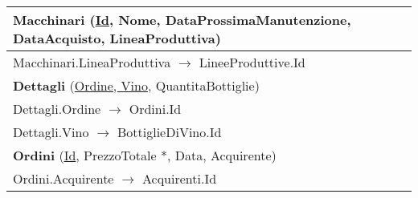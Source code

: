 \begin{center}
\begin{minipage}[t]{7.5cm}
{\begin{tabular}{P{7.5cm}}
				\midrule
				 \textbf{Macchinari} (\underline{Id}, Nome, DataProssimaManutenzione, DataAcquisto, LineaProduttiva)                   \\
				\midrule
				Macchinari.LineaProduttiva $\to$ LineeProduttive.Id                                                                                                    \\                                
				\midrule
				 \textbf{Dettagli} (\underline{Ordine, Vino}, QuantitaBottiglie)                      \\
				\midrule
				Dettagli.Ordine $\to$ Ordini.Id                                                                                       \\
				\midrule
				Dettagli.Vino $\to$ BottiglieDiVino.Id                                                                                \\                                
				\midrule
				 \textbf{Ordini} (\underline{Id}, PrezzoTotale *, Data, Acquirente)                                                    \\
				\midrule
				Ordini.Acquirente $\to$ Acquirenti.Id                                                                                                                  \\                                
				\midrule
			\end{tabular}
		}
	\end{minipage}
\end{center}



